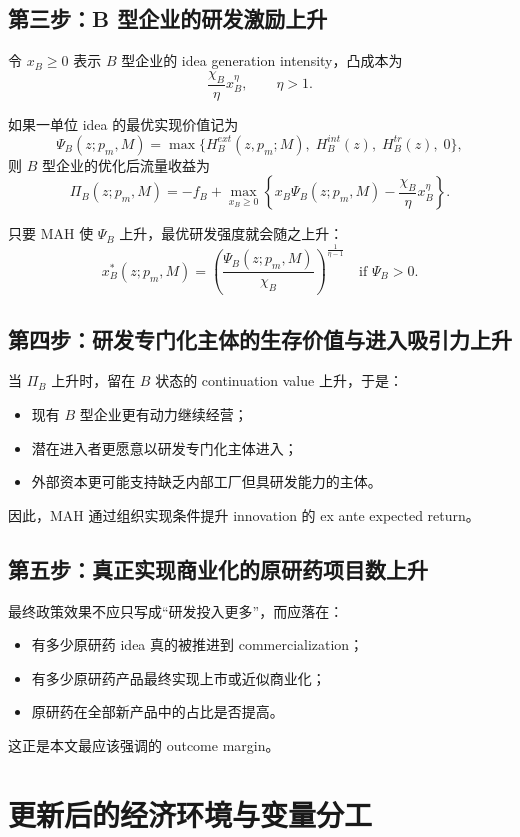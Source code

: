 \documentclass[12pt,fontset=none]{ctexart}
\begin{document}
\subsection{第三步：B 型企业的研发激励上升}

令 $x_B\ge 0$ 表示 $B$ 型企业的 idea generation intensity，凸成本为
\[
\frac{\chi_B}{\eta}x_B^{\eta},\qquad \eta>1.
\]

如果一单位 idea 的最优实现价值记为
\[
\Psi_B(z;p_m,M)=\max\{H_B^{ext}(z,p_m;M),\;H_B^{int}(z),\;H_B^{tr}(z),\;0\},
\]
则 $B$ 型企业的优化后流量收益为
\[
\Pi_B(z;p_m,M)= -f_B+ \max_{x_B\ge 0}\left\{x_B\Psi_B(z;p_m,M)-\frac{\chi_B}{\eta}x_B^{\eta}\right\}.
\]

只要 MAH 使 $\Psi_B$ 上升，最优研发强度就会随之上升：
\[
 x_B^*(z;p_m,M)=\left(\frac{\Psi_B(z;p_m,M)}{\chi_B}\right)^{\frac{1}{\eta-1}}
 \quad \text{if } \Psi_B>0.
\]

\subsection{第四步：研发专门化主体的生存价值与进入吸引力上升}

当 $\Pi_B$ 上升时，留在 $B$ 状态的 continuation value 上升，于是：
\begin{itemize}
    \item 现有 $B$ 型企业更有动力继续经营；
    \item 潜在进入者更愿意以研发专门化主体进入；
    \item 外部资本更可能支持缺乏内部工厂但具研发能力的主体。
\end{itemize}

因此，MAH 通过组织实现条件提升 innovation 的 ex ante expected return。

\subsection{第五步：真正实现商业化的原研药项目数上升}

最终政策效果不应只写成“研发投入更多”，而应落在：
\begin{itemize}
    \item 有多少原研药 idea 真的被推进到 commercialization；
    \item 有多少原研药产品最终实现上市或近似商业化；
    \item 原研药在全部新产品中的占比是否提高。
\end{itemize}

这正是本文最应该强调的 outcome margin。

\section{更新后的经济环境与变量分工}
\end{document}
